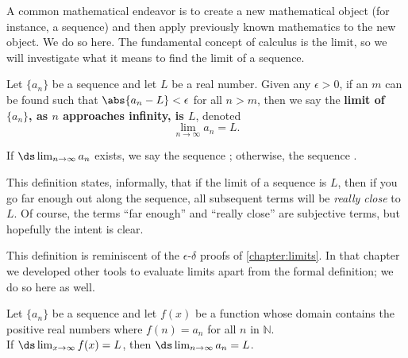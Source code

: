 A common mathematical endeavor is to create a new mathematical object (for instance, a sequence) and then apply previously known mathematics to the new object. We do so here. The fundamental concept of calculus is the limit, so we will investigate what it means to find the limit of a sequence.

{Let $\{a_n\}$ be a sequence and let $L$ be a real number. Given any $\epsilon>0$, if an $m$ can be found such that $\abs{a_n-L}<\epsilon$ for all $n>m$, then we say the \textbf{limit of $\{a_n\}$, as $n$ approaches infinity, is $L$}, denoted \[\lim_{n\to\infty}a_n = L.\]

If $\ds\lim_{n\to\infty} a_n$ exists, we say the sequence ; otherwise, the sequence .
}

This definition states, informally, that if the limit of a sequence is $L$, then if you go far enough out along the sequence, all subsequent terms will be \emph{really close} to $L$. Of course, the terms ``far enough'' and ``really close'' are subjective terms, but hopefully the intent is clear.

This definition is reminiscent of the $\epsilon$-$\delta$ proofs of \autoref{chapter:limits}. In that chapter we developed other tools to evaluate limits apart from the formal definition; we do so here as well.

{Let $\{a_n\}$ be a sequence and let $f(x)$ be a function whose domain contains the positive real numbers where $f(n) = a_n$ for all $n$ in $\mathbb{N}$. \\

If $\ds \lim_{x\to\infty} f(x) = L$, then $\ds\lim_{n\to\infty} a_n = L$.
}

